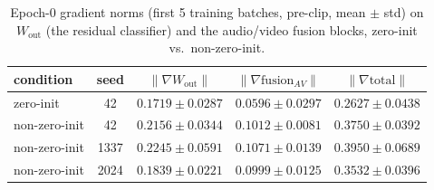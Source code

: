 \begin{table}[t]
\centering
\caption{Epoch-0 gradient norms (first 5 training batches, pre-clip, mean $\pm$ std) on $W_{\text{out}}$ (the residual classifier) and the audio/video fusion blocks, zero-init vs.\ non-zero-init.}
\label{tab:nonzero-init-gradients}
\begin{tabular}{lcccc}
\toprule
condition & seed & $\lVert\nabla W_{\text{out}}\rVert$ & $\lVert\nabla \text{fusion}_{AV}\rVert$ & $\lVert\nabla \text{total}\rVert$ \\
\midrule
zero-init & 42 & $0.1719 \pm 0.0287$ & $0.0596 \pm 0.0297$ & $0.2627 \pm 0.0438$ \\
non-zero-init & 42 & $0.2156 \pm 0.0344$ & $0.1012 \pm 0.0081$ & $0.3750 \pm 0.0392$ \\
non-zero-init & 1337 & $0.2245 \pm 0.0591$ & $0.1071 \pm 0.0139$ & $0.3950 \pm 0.0689$ \\
non-zero-init & 2024 & $0.1839 \pm 0.0221$ & $0.0999 \pm 0.0125$ & $0.3532 \pm 0.0396$ \\
\bottomrule
\end{tabular}
\end{table}
